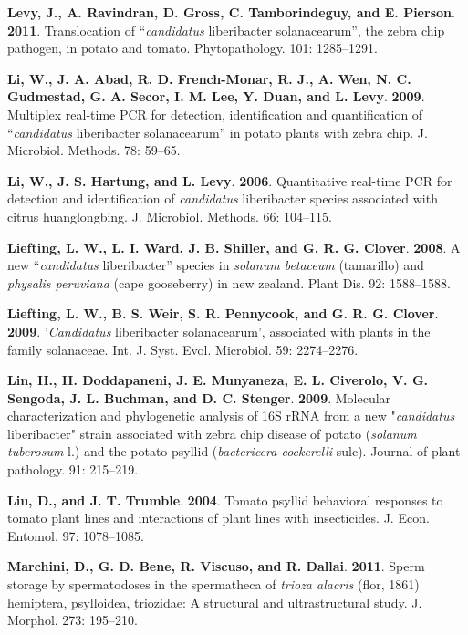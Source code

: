 \documentclass[]{article}
\begin{document}
\leavevmode\hypertarget{ref-Levy2011}{}%
\textbf{Levy, J., A. Ravindran, D. Gross, C. Tamborindeguy, and E.
Pierson}. \textbf{2011}. Translocation of ``\emph{candidatus}
liberibacter solanacearum'', the zebra chip pathogen, in potato and
tomato. Phytopathology. 101: 1285--1291.

\leavevmode\hypertarget{ref-Li2009}{}%
\textbf{Li, W., J. A. Abad, R. D. French-Monar, R. J., A. Wen, N. C.
Gudmestad, G. A. Secor, I. M. Lee, Y. Duan, and L. Levy}. \textbf{2009}.
Multiplex real-time PCR for detection, identification and quantification
of ``\emph{candidatus} liberibacter solanacearum'' in potato plants with
zebra chip. J. Microbiol. Methods. 78: 59--65.

\leavevmode\hypertarget{ref-Li2006}{}%
\textbf{Li, W., J. S. Hartung, and L. Levy}. \textbf{2006}. Quantitative
real-time PCR for detection and identification of \emph{candidatus}
liberibacter species associated with citrus huanglongbing. J. Microbiol.
Methods. 66: 104--115.

\leavevmode\hypertarget{ref-Liefting2008}{}%
\textbf{Liefting, L. W., L. I. Ward, J. B. Shiller, and G. R. G.
Clover}. \textbf{2008}. A new ``\emph{candidatus} liberibacter'' species
in \emph{solanum betaceum} (tamarillo) and \emph{physalis peruviana}
(cape gooseberry) in new zealand. Plant Dis. 92: 1588--1588.

\leavevmode\hypertarget{ref-Liefting2009}{}%
\textbf{Liefting, L. W., B. S. Weir, S. R. Pennycook, and G. R. G.
Clover}. \textbf{2009}. '\emph{Candidatus} liberibacter solanacearum',
associated with plants in the family solanaceae. Int. J. Syst. Evol.
Microbiol. 59: 2274--2276.

\leavevmode\hypertarget{ref-Lin2009}{}%
\textbf{Lin, H., H. Doddapaneni, J. E. Munyaneza, E. L. Civerolo, V. G.
Sengoda, J. L. Buchman, and D. C. Stenger}. \textbf{2009}. Molecular
characterization and phylogenetic analysis of 16S rRNA from a new
"\emph{candidatus} liberibacter" strain associated with zebra chip
disease of potato (\emph{solanum tuberosum} l.) and the potato psyllid
(\emph{bactericera cockerelli} sulc). Journal of plant pathology. 91:
215--219.

\leavevmode\hypertarget{ref-Liu2004}{}%
\textbf{Liu, D., and J. T. Trumble}. \textbf{2004}. Tomato psyllid
behavioral responses to tomato plant lines and interactions of plant
lines with insecticides. J. Econ. Entomol. 97: 1078--1085.

\leavevmode\hypertarget{ref-Marchini2011}{}%
\textbf{Marchini, D., G. D. Bene, R. Viscuso, and R. Dallai}.
\textbf{2011}. Sperm storage by spermatodoses in the spermatheca of
\emph{trioza alacris} (flor, 1861) hemiptera, psylloidea, triozidae: A
structural and ultrastructural study. J. Morphol. 273: 195--210.
\end{document}
